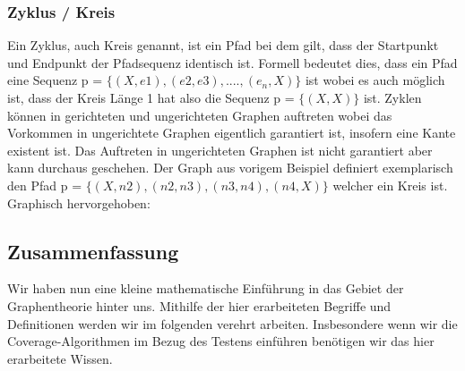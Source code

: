 \subsubsection{Zyklus / Kreis}

Ein Zyklus, auch Kreis genannt, ist ein Pfad bei dem gilt, dass der Startpunkt und Endpunkt der Pfadsequenz identisch ist.
Formell bedeutet dies, dass ein Pfad eine Sequenz p = $ \{ (X, e1), (e2, e3), ...., (e_n, X) \}$ ist wobei es auch möglich ist, dass
der Kreis Länge 1 hat also die Sequenz p = $ \{ (X, X) \}$ ist.
Zyklen können in gerichteten und ungerichteten Graphen auftreten wobei das Vorkommen in ungerichtete Graphen eigentlich garantiert ist,
insofern eine Kante existent ist.
Das Auftreten in ungerichteten Graphen ist nicht garantiert aber kann durchaus geschehen.
Der Graph aus vorigem Beispiel definiert exemplarisch den Pfad p = $ \{ (X, n2), (n2, n3), (n3, n4), (n4, X) \}$  welcher ein Kreis ist.
Graphisch hervorgehoben:


\subsection{Zusammenfassung}

Wir haben nun eine kleine mathematische Einführung in das Gebiet der Graphentheorie hinter uns.
Mithilfe der hier erarbeiteten Begriffe und Definitionen werden wir im folgenden verehrt arbeiten.
Insbesondere wenn wir die Coverage-Algorithmen im Bezug des Testens einführen benötigen wir das hier erarbeitete Wissen.





